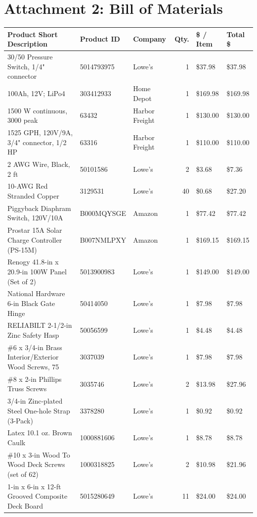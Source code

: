 \documentclass[12pt]{article}
\begin{document}
\newpage

\section*{Attachment 2: Bill of Materials}
\scriptsize
\begin{tabular}{@{}lllrll@{}}
\toprule
\textbf{Product Short Description} & \textbf{Product ID} & \textbf{Company} & \textbf{Qty.} & \textbf{\$ / Item} & \textbf{Total \$} \\ \midrule
30/50 Pressure Switch, 1/4" connector & 5014793975 & Lowe's & 1 & \$37.98 & \$37.98 \\
100Ah, 12V; LiPo4 & 303412933 & Home Depot & 1 & \$169.98 & \$169.98 \\
1500 W continuous, 3000 peak & 63432 & Harbor Freight & 1 & \$130.00 & \$130.00 \\
1525 GPH, 120V/9A, 3/4" connector, 1/2 HP & 63316 & Harbor Freight & 1 & \$110.00 & \$110.00 \\
2 AWG Wire, Black, 2 ft & 50101586 & Lowe's & 2 & \$3.68 & \$7.36 \\
10-AWG Red Stranded Copper & 3129531 & Lowe's & 40 & \$0.68 & \$27.20 \\
Piggyback Diaphram Switch, 120V/10A & B000MQYSGE & Amazon & 1 & \$77.42 & \$77.42 \\
Prostar 15A Solar Charge Controller (PS-15M) & B007NMLPXY & Amazon & 1 & \$169.15 & \$169.15 \\
Renogy 41.8-in x 20.9-in 100W Panel (Set of 2) & 5013900983 & Lowe's & 1 & \$149.00 & \$149.00 \\
National Hardware 6-in Black Gate Hinge & 50414050 & Lowe's & 1 & \$7.98 & \$7.98 \\
RELIABILT 2-1/2-in Zinc Safety Hasp & 50056599 & Lowe's & 1 & \$4.48 & \$4.48 \\
\#6 x 3/4-in Brass Interior/Exterior Wood Screws, 75 & 3037039 & Lowe's & 1 & \$7.98 & \$7.98 \\
\#8 x 2-in Phillips Truss Screws & 3035746 & Lowe's & 2 & \$13.98 & \$27.96 \\
3/4-in Zinc-plated Steel One-hole Strap (3-Pack) & 3378280 & Lowe's & 1 & \$0.92 & \$0.92 \\
Latex 10.1 oz. Brown Caulk & 1000881606 & Lowe's & 1 & \$8.78 & \$8.78 \\
\#10 x 3-in Wood To Wood Deck Screws (set of 62) & 1000318825 & Lowe's & 2 & \$10.98 & \$21.96 \\
1-in x 6-in x 12-ft Grooved Composite Deck Board & 5015280649 & Lowe's & 11 & \$24.00 & \$24.00 \\

\end{tabular}
\end{document}
